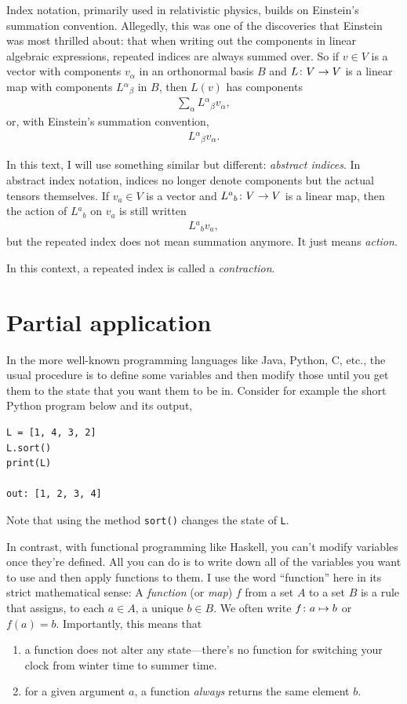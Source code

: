 \documentclass[english, 12pt]{article}
\begin{document}
Index notation, primarily used in relativistic physics, builds on Einstein's summation convention.
Allegedly, this was one of the discoveries that Einstein was most thrilled about: that when writing out the components in linear algebraic expressions, repeated indices are always summed over.
So if \(v \in V\) is a vector with components \(v_\alpha\) in an orthonormal basis \(B\) and \(L \colon V \to V\) is a linear map with components \(L{}^\alpha{}_\beta\) in \(B\), then \(L(v)\) has components
\begin{align*}
	\sum_\alpha L{}^\alpha{}_\beta v_\alpha,
\end{align*}
or, with Einstein's summation convention,
\begin{align*}
	L{}^\alpha{}_\beta v_\alpha.
\end{align*}

In this text, I will use something similar but different: \emph{abstract indices}.
In abstract index notation, indices no longer denote components but the actual tensors themselves.
If \(v_a \in V\) is a vector and \(L{}^a{}_b \colon V \to V\) is a linear map, then the action of \(L{}^a{}_b\) on \(v_a\) is still written
\begin{align*}
	L{}^a{}_b v_a,
\end{align*}
but the repeated index does not mean summation anymore.
It just means \emph{action}.

In this context, a repeated index is called a \emph{contraction}.


\section{Partial application}%
\label{sec:partial_application}

In the more well-known programming languages like Java, Python, C, etc., the usual procedure is to define some variables and then modify those until you get them to the state that you want them to be in.
Consider for example the short Python program below and its output,
\begin{verbatim}
L = [1, 4, 3, 2]
L.sort()
print(L)

out: [1, 2, 3, 4]
\end{verbatim}
Note that using the method \verb|sort()| changes the state of \verb|L|.

In contrast, with functional programming like Haskell, you can't modify variables once they're defined.
All you can do is to write down all of the variables you want to use and then apply functions to them.
I use the word \enquote{function} here in its strict mathematical sense: A \emph{function} (or \emph{map}) \(f\) from a set \(A\) to a set \(B\) is a rule that assigns, to each \(a \in A\), a unique \(b \in B\).
We often write \(f \colon a \mapsto b\) or \(f(a) = b\).
Importantly, this means that
\begin{enumerate}
	\item a function does not alter any state---there's no function for switching your clock from winter time to summer time.
	\item for a given argument \(a\), a function \emph{always} returns the same element \(b\).
\end{enumerate}
\end{document}
